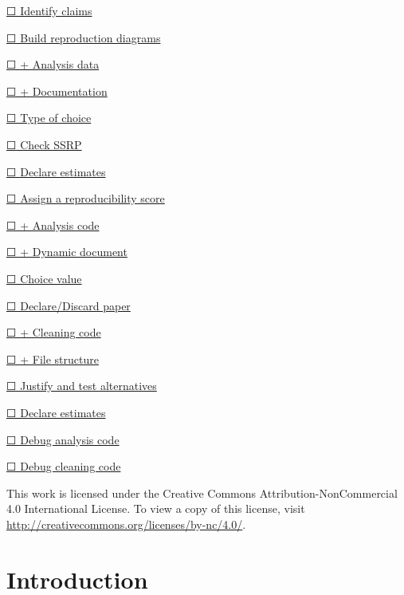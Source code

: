 \documentclass[
]{book}
\begin{document}
\protect\hyperlink{declare-estimates}{☐ Identify claims}

\protect\hyperlink{diagram}{☐ Build reproduction diagrams}

\protect\hyperlink{ad}{☐ + Analysis data}

\protect\hyperlink{paper-level}{☐ + Documentation}

\protect\hyperlink{id-type}{☐ Type of choice}

\protect\hyperlink{check-acre}{☐ Check SSRP}

\protect\hyperlink{declare-estimates}{☐ Declare estimates}

\protect\hyperlink{score}{☐ Assign a reproducibility score}

\protect\hyperlink{ac}{☐ + Analysis code}

\protect\hyperlink{paper-level}{☐ + Dynamic document}

\protect\hyperlink{id-val}{☐ Choice value}

\protect\hyperlink{read-summ}{☐ Declare/Discard paper}

\protect\hyperlink{cc}{☐ + Cleaning code}

\protect\hyperlink{paper-level}{☐ + File structure}

\protect\hyperlink{test-rob}{☐ Justify and test alternatives}

\protect\hyperlink{declare-estimates}{☐ Declare estimates}

\protect\hyperlink{dac}{☐ Debug analysis code}

\protect\hyperlink{dcc}{☐ Debug cleaning code}

This work is licensed under the Creative Commons Attribution-NonCommercial 4.0 International License. To view a copy of this license, visit \url{http://creativecommons.org/licenses/by-nc/4.0/}.

\hypertarget{intro}{%
\chapter*{Introduction}\label{intro}}
\end{document}
